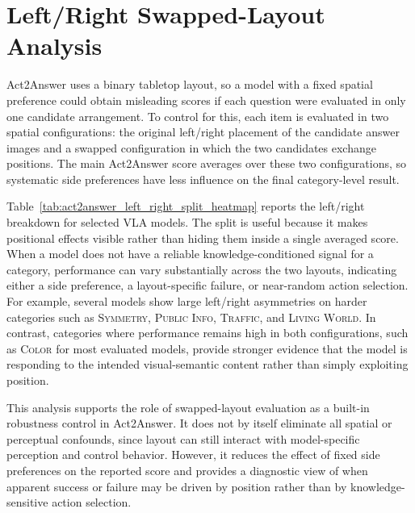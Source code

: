 \documentclass[11pt]{article}
\begin{document}
\section{Left/Right Swapped-Layout Analysis}
\label{appendix:left_right_swapped_layout}

Act2Answer uses a binary tabletop layout, so a model with a fixed spatial preference could obtain misleading scores if each question were evaluated in only one candidate arrangement.
To control for this, each item is evaluated in two spatial configurations: the original left/right placement of the candidate answer images and a swapped configuration in which the two candidates exchange positions.
The main Act2Answer score averages over these two configurations, so systematic side preferences have less influence on the final category-level result.

Table~\ref{tab:act2answer_left_right_split_heatmap} reports the left/right breakdown for selected VLA models.
The split is useful because it makes positional effects visible rather than hiding them inside a single averaged score.
When a model does not have a reliable knowledge-conditioned signal for a category, performance can vary substantially across the two layouts, indicating either a side preference, a layout-specific failure, or near-random action selection.
For example, several models show large left/right asymmetries on harder categories such as \textsc{Symmetry}, \textsc{Public Info}, \textsc{Traffic}, and \textsc{Living World}.
In contrast, categories where performance remains high in both configurations, such as \textsc{Color} for most evaluated models, provide stronger evidence that the model is responding to the intended visual-semantic content rather than simply exploiting position.

This analysis supports the role of swapped-layout evaluation as a built-in robustness control in Act2Answer.
It does not by itself eliminate all spatial or perceptual confounds, since layout can still interact with model-specific perception and control behavior.
However, it reduces the effect of fixed side preferences on the reported score and provides a diagnostic view of when apparent success or failure may be driven by position rather than by knowledge-sensitive action selection.
\end{document}
